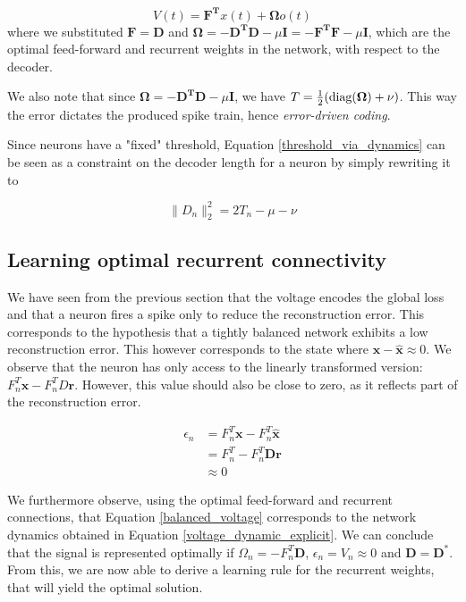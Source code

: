 \documentclass[twoside,11pt]{article}
\begin{document}
\begin{equation*}
  V(t) = \mathbf{F^T}x(t) + \mathbf{\Omega} o(t)
\end{equation*}
where we substituted $\mathbf{F} = \mathbf{D}$ and $\mathbf{\Omega} = -\mathbf{D^TD} - \mu \mathbf{I} = -\mathbf{F^TF} - \mu \mathbf{I}$, which are the optimal feed-forward and
recurrent weights in the network, with respect to the decoder.

We also note that since $\mathbf{\Omega} = -\mathbf{D^TD} - \mu \mathbf{I}$, we have $T = \frac{1}{2}(\textnormal{diag}(\mathbf{\Omega}) + \nu)$.
This way the error dictates the produced spike train, hence \emph{error-driven coding}.

Since neurons have a "fixed" threshold, Equation \ref{threshold_via_dynamics} can be seen
as a constraint on the decoder length for a neuron by simply rewriting it to

\begin{equation*}
  \|D_n\|_2^2 = 2T_n - \mu - \nu
\end{equation*} 


\subsection{Learning optimal recurrent connectivity}

We have seen from the previous section that the voltage encodes the global loss and
that a neuron fires a spike only to reduce the reconstruction error.
This corresponds to the hypothesis that a tightly balanced network exhibits a low reconstruction
error.
This however corresponds to the state where $\mathbf{x} - \mathbf{\hat{x}} \approx 0$.
We observe that the neuron has only access to the linearly transformed version: $F_n^T\mathbf{x} - F_n^TD\mathbf{r}$. 
However, this value should also be close to zero, as it reflects part of the reconstruction error.

\begin{equation} \label{balanced_voltage}
  \begin{split}
    \epsilon_n &= F^T_n\mathbf{x}-F^T_n\mathbf{\hat{x}} \\
    &= F_n^T - F^T_n\mathbf{Dr} \\
    &\approx 0
  \end{split}
\end{equation}

We furthermore observe, using the optimal feed-forward and recurrent connections, that Equation
\ref{balanced_voltage} corresponds to the network dynamics obtained in Equation \ref{voltage_dynamic_explicit}.
We can conclude that the signal is represented optimally if $\Omega_n = -F^T_n\mathbf{D}$, $\epsilon_n = V_n \approx 0$ and
$\mathbf{D} = \mathbf{D}^*$.
From this, we are now able to derive a learning rule for the recurrent weights, that will yield
the optimal solution.
\end{document}
